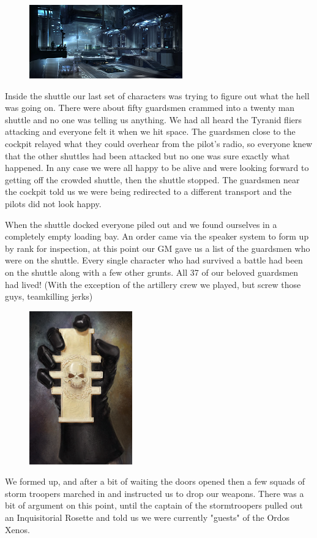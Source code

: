 \begin{figure}
	\begin{center}
		\includegraphics[width=\figwidth]{pics/1/9.png}
	\end{center}
\end{figure}
Inside the shuttle our last set of characters was trying to figure out what the hell was going on. 
There were about fifty guardsmen crammed into a twenty man shuttle and no one was telling us anything. 
We had all heard the Tyranid fliers attacking and everyone felt it when we hit space. 
The guardsmen close to the cockpit relayed what they could overhear from the pilot's radio, so everyone knew that the other shuttles had been attacked but no one was sure exactly what happened.
In any case we were all happy to be alive and were looking forward to getting off the crowded shuttle, then the shuttle stopped. 
The guardsmen near the cockpit told us we were being redirected to a different transport and the pilots did not look happy.

When the shuttle docked everyone piled out and we found ourselves in a completely empty loading bay. 
An order came via the speaker system to form up by rank for inspection, at this point our GM gave us a list of the guardsmen who were on the shuttle. 
Every single character who had survived a battle had been on the shuttle along with a few other grunts. 
All 37 of our beloved guardsmen had lived! (With the exception of the artillery crew we played, but screw those guys, teamkilling jerks)

\begin{figure}
	\begin{center}
		\includegraphics[width=\figwidth]{pics/1/10.png}
	\end{center}
\end{figure}
We formed up, and after a bit of waiting the doors opened then a few squads of storm troopers marched in and instructed us to drop our weapons.
There was a bit of argument on this point, until the captain of the stormtroopers pulled out an Inquisitorial Rosette and told us we were currently "guests" of the Ordos Xenos.

